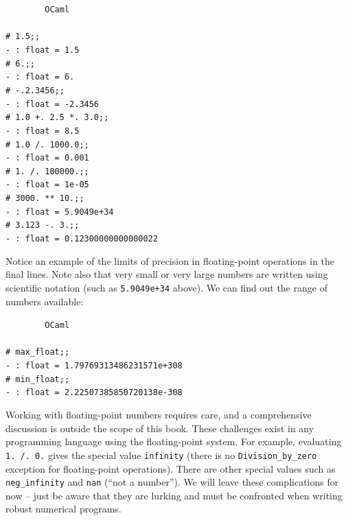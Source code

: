 \documentclass[]{book}
\newcommand{\smspace}{\vspace{4mm}}
\begin{document}
\smspace
\noindent\verb!        OCaml!\\
\noindent\\
\noindent\verb!# 1.5;;!\\
\verb!- : float = 1.5!\\
\verb!# 6.;;!\\
\verb!- : float = 6.!\\
\verb!# -.2.3456;;!\\
\verb!- : float = -2.3456!\\
\verb!# 1.0 +. 2.5 *. 3.0;;!\\
\verb!- : float = 8.5!\\
\verb!# 1.0 /. 1000.0;;!\\
\verb!- : float = 0.001!\\
\verb!# 1. /. 100000.;;!\\
\verb!- : float = 1e-05!\\
\verb!# 3000. ** 10.;;!\\
\verb!- : float = 5.9049e+34!\\
\verb!# 3.123 -. 3.;;!\\
\verb!- : float = 0.12300000000000022!\vphantom{g}
\smspace

\noindent Notice an example of the limits of precision in floating-point operations in the final lines. Note also that very small or very large numbers are written using scientific notation (such as \texttt{5.9049e+34} above). We can find out the range of numbers available:

\smspace
\noindent\verb!        OCaml!\\
\noindent\\
\verb!# max_float;;!\\
\verb!- : float = 1.79769313486231571e+308!\\
\verb!# min_float;;!\\
\verb!- : float = 2.22507385850720138e-308!\vphantom{g}
\smspace

\noindent Working with floating-point numbers requires care, and a comprehensive discussion is outside the scope of this book. These challenges exist in any programming language using the floating-point system. For example, evaluating \texttt{1. /. 0.} gives the special value \texttt{infinity} (there is no \texttt{Division\_by\_zero} exception for floating-point operations). There are other special values such as \verb!neg_infinity! and \verb!nan! (``not a number''). We will leave these complications for now -- just be aware that they are lurking and must be confronted when writing robust numerical programs.
\end{document}
